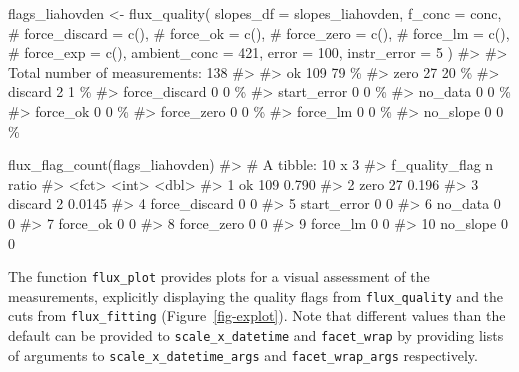 \documentclass[
  letterpaper,
  DIV=11,
  numbers=noendperiod]{scrartcl}
\newenvironment{Shaded}{\begin{snugshade}}{\end{snugshade}}
\newcommand{\AttributeTok}[1]{\textcolor[rgb]{0.40,0.45,0.13}{#1}}
\newcommand{\CommentTok}[1]{\textcolor[rgb]{0.37,0.37,0.37}{#1}}
\newcommand{\DecValTok}[1]{\textcolor[rgb]{0.68,0.00,0.00}{#1}}
\newcommand{\FunctionTok}[1]{\textcolor[rgb]{0.28,0.35,0.67}{#1}}
\newcommand{\NormalTok}[1]{\textcolor[rgb]{0.00,0.23,0.31}{#1}}
\newcommand{\OtherTok}[1]{\textcolor[rgb]{0.00,0.23,0.31}{#1}}
\begin{document}
\begin{Shaded}
\begin{Highlighting}[]
\NormalTok{flags\_liahovden }\OtherTok{\textless{}{-}} \FunctionTok{flux\_quality}\NormalTok{(}
  \AttributeTok{slopes\_df =}\NormalTok{ slopes\_liahovden,}
  \AttributeTok{f\_conc =}\NormalTok{ conc,}
  \CommentTok{\# force\_discard = c(),}
  \CommentTok{\# force\_ok = c(),}
  \CommentTok{\# force\_zero = c(),}
  \CommentTok{\# force\_lm = c(),}
  \CommentTok{\# force\_exp = c(),}
  \AttributeTok{ambient\_conc =} \DecValTok{421}\NormalTok{,}
  \AttributeTok{error =} \DecValTok{100}\NormalTok{,}
  \AttributeTok{instr\_error =} \DecValTok{5}
\NormalTok{)}
\CommentTok{\#\textgreater{} }
\CommentTok{\#\textgreater{}  Total number of measurements: 138}
\CommentTok{\#\textgreater{} }
\CommentTok{\#\textgreater{}  ok   109     79 \%}
\CommentTok{\#\textgreater{}  zero     27      20 \%}
\CommentTok{\#\textgreater{}  discard      2   1 \%}
\CommentTok{\#\textgreater{}  force\_discard    0   0 \%}
\CommentTok{\#\textgreater{}  start\_error      0   0 \%}
\CommentTok{\#\textgreater{}  no\_data      0   0 \%}
\CommentTok{\#\textgreater{}  force\_ok     0   0 \%}
\CommentTok{\#\textgreater{}  force\_zero   0   0 \%}
\CommentTok{\#\textgreater{}  force\_lm     0   0 \%}
\CommentTok{\#\textgreater{}  no\_slope     0   0 \%}

\FunctionTok{flux\_flag\_count}\NormalTok{(flags\_liahovden)}
\CommentTok{\#\textgreater{} \# A tibble: 10 x 3}
\CommentTok{\#\textgreater{}    f\_quality\_flag     n  ratio}
\CommentTok{\#\textgreater{}    \textless{}fct\textgreater{}          \textless{}int\textgreater{}  \textless{}dbl\textgreater{}}
\CommentTok{\#\textgreater{}  1 ok               109 0.790 }
\CommentTok{\#\textgreater{}  2 zero              27 0.196 }
\CommentTok{\#\textgreater{}  3 discard            2 0.0145}
\CommentTok{\#\textgreater{}  4 force\_discard      0 0     }
\CommentTok{\#\textgreater{}  5 start\_error        0 0     }
\CommentTok{\#\textgreater{}  6 no\_data            0 0     }
\CommentTok{\#\textgreater{}  7 force\_ok           0 0     }
\CommentTok{\#\textgreater{}  8 force\_zero         0 0     }
\CommentTok{\#\textgreater{}  9 force\_lm           0 0     }
\CommentTok{\#\textgreater{} 10 no\_slope           0 0}
\end{Highlighting}
\end{Shaded}

The function \texttt{flux\_plot} provides plots for a visual assessment
of the measurements, explicitly displaying the quality flags from
\texttt{flux\_quality} and the cuts from \texttt{flux\_fitting}
(Figure~\ref{fig-explot}). Note that different values than the default
can be provided to \texttt{scale\_x\_datetime} and \texttt{facet\_wrap}
by providing lists of arguments to \texttt{scale\_x\_datetime\_args} and
\texttt{facet\_wrap\_args} respectively.
\end{document}

